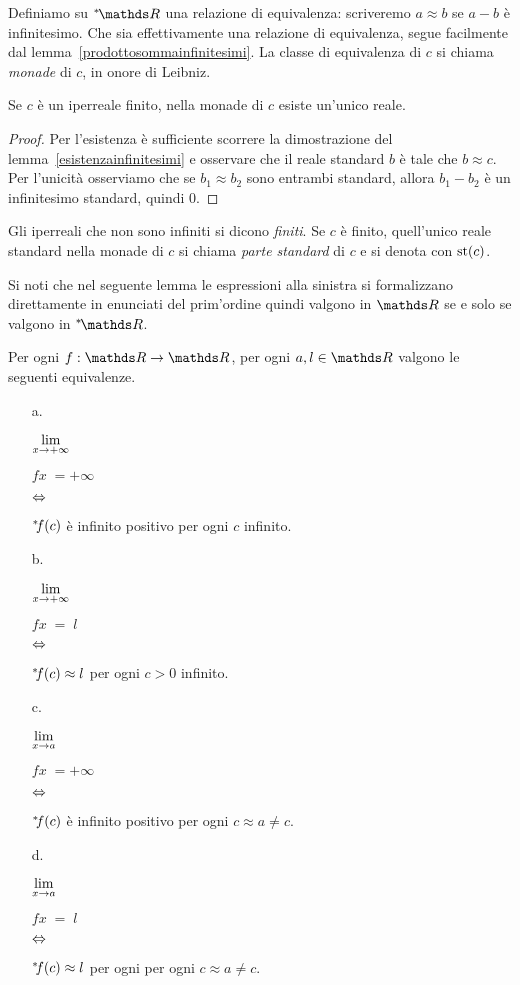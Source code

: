 Definiamo su $\nsR$ una relazione di equivalenza: scriveremo $a\approx b$ se $a-b$ \`e infinitesimo. Che sia effettivamente una relazione di equivalenza, segue facilmente dal lemma~\ref{prodottosommainfinitesimi}. La classe di equivalenza di $c$ si chiama \emph{monade\/} di $c$, in onore di Leibniz.

\begin{lemma}
Se $c$ \`e un iperreale finito, nella monade di $c$ esiste un'unico reale.
\end{lemma}
\begin{proof}
Per l'esistenza \`e sufficiente scorrere la dimostrazione del lemma~\ref{esistenzainfinitesimi} e osservare che il reale standard $b$ \`e tale che $b\approx c$. Per l'unicit\`a osserviamo che se $b_1\approx b_2$ sono entrambi standard, allora $b_1-b_2$ \`e un infinitesimo standard, quindi $0$.  
\end{proof}

Gli iperreali che non sono infiniti si dicono \emph{finiti}. Se $c$ \`e finito, quell'unico reale standard nella monade di $c$ si chiama \emph{parte standard\/} di $c$ e si denota con \emph{$\mathop\textrm{st}(c)$}.

Si noti che nel seguente lemma le espressioni alla sinistra si formalizzano direttamente in enunciati del prim'ordine quindi valgono in $\RR$ se e solo se valgono in $\nsR$.

\begin{proposition}\label{fattolimitinonstandard}
Per ogni $f:\RR\to\RR$, per ogni $a, l\in\RR$ valgono le seguenti equivalenze.
\begin{itemize}
\item[a.]\ \parbox{6ex}{$\displaystyle\lim_{x\rightarrow+\infty}$}\parbox{8ex}{$fx\;=+\infty$}\parbox{12ex}{\hfil$\Leftrightarrow$}${}^{*\hskip-.5ex} f(c)$ \`e infinito positivo per ogni $c$ infinito.

\item[b.]\ \parbox{6ex}{$\displaystyle\lim_{x\rightarrow+\infty}$}\parbox{8ex}{$fx\;=\;l$}\parbox{12ex}{\hfil$\Leftrightarrow$}${}^{*\hskip-.5ex} f(c)\approx l$ per ogni $c>0$ infinito.

\item[c.]\ \parbox{6ex}{$\displaystyle\lim_{x\rightarrow a}$}\parbox{8ex}{$fx\;=+\infty$}\parbox{12ex}{\hfil$\Leftrightarrow$}${}^{*\hskip-.5ex} f(c)$ \`e infinito positivo per ogni $c\approx a\neq c$.

\item[d.]\ \parbox{6ex}{$\displaystyle\lim_{x\rightarrow a}$}\parbox{8ex}{$fx\;=\;l$}\parbox{12ex}{\hfil$\Leftrightarrow$}${}^{*\hskip-.5ex} f(c)\approx l$ per ogni per ogni $c\approx a\neq c$.
\end{itemize}
\end{proposition}

